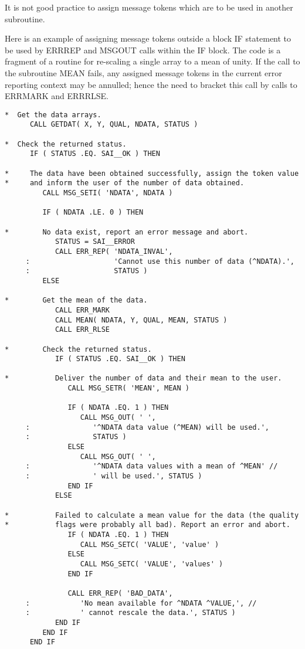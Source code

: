 \documentclass[twoside,11pt]{article}
\renewcommand{\_}{\texttt{\symbol{95}}}
\begin{document}
It is not good practice to assign message tokens which are to be used in
another subroutine.

Here is an example of assigning message tokens outside a block IF statement
to be used by ERR\_REP and MSG\_OUT calls within the IF block. 
The code is a fragment of a routine for re-scaling a single array to a mean 
of unity.
If the call to the subroutine MEAN fails, any assigned message tokens in the 
current error reporting context may be annulled; hence the need to bracket this
call by calls to ERR\_MARK and ERR\_RLSE.

\begin{small}
\begin{verbatim}
*  Get the data arrays.
      CALL GETDAT( X, Y, QUAL, NDATA, STATUS )

*  Check the returned status.
      IF ( STATUS .EQ. SAI__OK ) THEN

*     The data have been obtained successfully, assign the token value 
*     and inform the user of the number of data obtained.
         CALL MSG_SETI( 'NDATA', NDATA )

         IF ( NDATA .LE. 0 ) THEN

*        No data exist, report an error message and abort.
            STATUS = SAI__ERROR
            CALL ERR_REP( 'NDATA_INVAL', 
     :                    'Cannot use this number of data (^NDATA).',
     :                    STATUS )
         ELSE

*        Get the mean of the data.
            CALL ERR_MARK
            CALL MEAN( NDATA, Y, QUAL, MEAN, STATUS )
            CALL ERR_RLSE

*        Check the returned status.
            IF ( STATUS .EQ. SAI__OK ) THEN

*           Deliver the number of data and their mean to the user.
               CALL MSG_SETR( 'MEAN', MEAN )

               IF ( NDATA .EQ. 1 ) THEN
                  CALL MSG_OUT( ' ', 
     :               '^NDATA data value (^MEAN) will be used.', 
     :               STATUS )
               ELSE
                  CALL MSG_OUT( ' ', 
     :               '^NDATA data values with a mean of ^MEAN' //
     :               ' will be used.', STATUS )
               END IF
            ELSE

*           Failed to calculate a mean value for the data (the quality
*           flags were probably all bad). Report an error and abort.
               IF ( NDATA .EQ. 1 ) THEN
                  CALL MSG_SETC( 'VALUE', 'value' )
               ELSE
                  CALL MSG_SETC( 'VALUE', 'values' )
               END IF

               CALL ERR_REP( 'BAD_DATA', 
     :            'No mean available for ^NDATA ^VALUE,', //
     :            ' cannot rescale the data.', STATUS )
            END IF
         END IF
      END IF
\end{verbatim}
\end{small}
\end{document}

